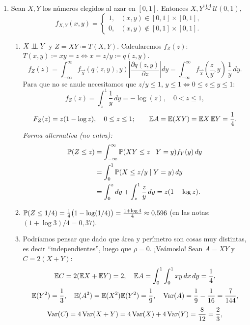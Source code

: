 \begin{enumerate}
  \item Sean $X, Y$ los números elegidos al azar en $[0, 1]$. Entonces $X, Y \stackrel{\text{i.i.d.}}{\sim} \mathcal{U}(0,1)$,
        \[
          f_{X,Y}(x,y) =
          \begin{cases}
            1, & (x,y) \in [0,1] \times [0,1], \\
            0, & (x,y) \notin [0,1] \times [0,1].
          \end{cases}
        \]
        \begin{enumerate}[label=(\alph*)]
          \item $X \perp\!\!\!\perp Y$ y $Z = XY \coloneqq T(X, Y)$. Calcularemos $f_Z(z)$: $T(x,y) \coloneqq xy = z \iff x = z/y \coloneqq q(z,y)$.
                \[
                  f_Z(z) = \int_{-\infty}^\infty f_{\vec{X}}(q(z,y), y)\left|\frac{\partial q(z,y)}{\partial z}\right| dy = \int_{-\infty}^\infty f_{\vec{X}}\left(\frac{z}{y}, y\right)\,\frac{1}{y}\,dy.
                \]
                Para que no se anule necesitamos que $z/y \le 1$, $y \le 1 \iff 0 \le z \le y \le 1$:
                \[
                  f_Z(z) = \int_z^1 \frac{1}{y}\,dy = -\log(z), \quad 0 < z \le 1,
                \]
                \[
                  F_Z(z) = z(1 - \log z), \quad 0 \le z \le 1; \qquad \mathbb{E} A = \mathbb{E}(XY) = \mathbb{E} X\,\mathbb{E} Y = \frac{1}{4}.
                \]
                \emph{Forma alternativa (no entra):}
                \begin{align*}
                  \mathbb{P}(Z \le z) & = \int_{-\infty}^\infty \mathbb{P}(XY \le z \mid Y = y)f_Y(y)\,dy \\ & = \int_0^1 \mathbb{P}(X \le z/y \mid Y = y)\,dy \\ & = \int_0^z dy + \int_z^1 \frac{z}{y}\,dy = z(1 - \log z).               
                \end{align*}
          \item $\mathbb{P}(Z \le 1/4) = \frac{1}{4}\bigl(1 - \log(1/4)\bigr) = \frac{1 + \log 4}{4} \approx 0{,}596$ (en las notas: $(1 + \log 3)/4 = 0{,}37$).
          \item Podríamos pensar que dado que área y perímetro son cosas muy distintas, es decir ``independientes'', luego que $\rho = 0$. ¡Veámoslo!
                Sean $A = XY$ y $C = 2(X + Y)$:
               \[ \mathbb{E} C = 2(\mathbb{E} X + \mathbb{E} Y) = 2, \quad \mathbb{E} A = \int_0^1 \int_0^1 xy\,dx\,dy = \frac{1}{4}, \]
               \[
                  \mathbb{E}(Y^2) = \frac{1}{3},\quad  \mathbb{E}(A^2) = \mathbb{E}(X^2)\mathbb{E}(Y^2) = \frac{1}{9}, \quad \operatorname{Var}(A) = \frac{1}{9} - \frac{1}{16} = \frac{7}{144}, \] 
                  \[\operatorname{Var}(C) = 4\operatorname{Var}(X + Y) = 4\operatorname{Var}(X) + 4\operatorname{Var}(Y) = \frac{8}{12} = \frac{2}{3}, \]

\end{enumerate}
\end{enumerate}
